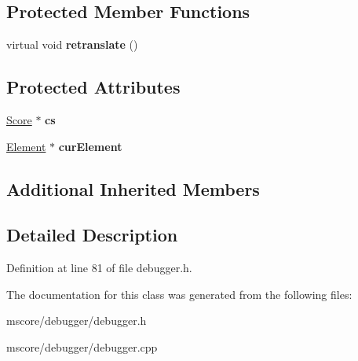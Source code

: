\subsection*{Protected Member Functions}
\begin{DoxyCompactItemize}
\item 
\mbox{\label{class_ms_1_1_debugger_a3d56e6f36a4957d3433a3eed48eb0637}} 
virtual void {\bfseries retranslate} ()
\end{DoxyCompactItemize}
\subsection*{Protected Attributes}
\begin{DoxyCompactItemize}
\item 
\mbox{\label{class_ms_1_1_debugger_aed8bba8d99b7676a13641ba47c4646f3}} 
\hyperlink{class_ms_1_1_score}{Score} $\ast$ {\bfseries cs}
\item 
\mbox{\label{class_ms_1_1_debugger_a8f7f40351779f0ea0f32bcedcf2365c2}} 
\hyperlink{class_ms_1_1_element}{Element} $\ast$ {\bfseries cur\+Element}
\end{DoxyCompactItemize}
\subsection*{Additional Inherited Members}


\subsection{Detailed Description}


Definition at line 81 of file debugger.\+h.



The documentation for this class was generated from the following files\+:\begin{DoxyCompactItemize}
\item 
mscore/debugger/debugger.\+h\item 
mscore/debugger/debugger.\+cpp\end{DoxyCompactItemize}
